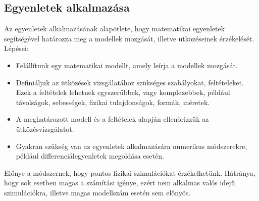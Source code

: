 \newpage
\subsection{Egyenletek alkalmazása}
Az egyenletek alkalmazásának alapötlete, hogy matematikai egyenletek segítségével határozza meg a modellek mozgását, illetve ütközéseinek érzékelését.
\\
Lépései:
\begin{itemize}
\item Felállítunk egy matematikai modellt, amely leírja a modellek mozgását.

\item Definiáljuk az ütközések vizsgálatához szükséges szabályokat, feltételeket. Ezek a feltételek lehetnek egyszerűbbek, vagy komplexebbek, például távolságok, sebességek, fizikai tulajdonságok, formák, méretek.

\item A meghatározott modell és a feltételek alapján ellenőrizzük az ütközésvizsgálatot.\

\item Gyakran szükség van az egyenletek alkalmazására numerikus módszerekre, például differenciálegyenletek megoldása esetén.
\end{itemize}
Előnye a módszernek, hogy pontos fizikai szimulációkat érzékelhetünk. Hátránya, hogy sok esetben magas a számítási igénye, ezért nem alkalmas valós idejű szimulációkra, illetve magas modellszám esetén sem előnyös.